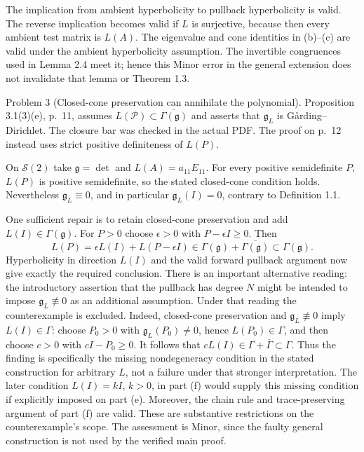 \documentclass[10pt]{article}
\begin{document}
The implication from ambient hyperbolicity to pullback hyperbolicity is valid. The reverse implication becomes valid if \(L\) is surjective, because then every ambient test matrix is \(L(A)\). The eigenvalue and cone identities in (b)–(c) are valid under the ambient hyperbolicity assumption. The invertible congruences used in Lemma 2.4 meet it; hence this Minor error in the general extension does not invalidate that lemma or Theorem 1.3.\par
Problem 3 (Closed-cone preservation can annihilate the polynomial).  Proposition 3.1(3)(e), p. 11, assumes \(L(\mathcal P)\subset\overline{\Gamma(\mathfrak g)}\) and asserts that \(\mathfrak g_L\) is Gårding–Dirichlet. The closure bar was checked in the actual PDF. The proof on p. 12 instead uses strict positive definiteness of \(L(P)\).\par
On \(\mathcal S(2)\) take \(\mathfrak g=\det\) and \(L(A)=a_{11}E_{11}\). For every positive semidefinite \(P\), \(L(P)\) is positive semidefinite, so the stated closed-cone condition holds. Nevertheless \(\mathfrak g_L\equiv0\), and in particular \(\mathfrak g_L(I)=0\), contrary to Definition 1.1.\par
One sufficient repair is to retain closed-cone preservation and add \(L(I)\in\Gamma(\mathfrak g)\). For \(P>0\) choose \(\epsilon>0\) with \(P-\epsilon I\geq0\). Then \[L(P)=\epsilon L(I)+L(P-\epsilon I)
       \in\Gamma(\mathfrak g)+\overline{\Gamma(\mathfrak g)}
       \subset\Gamma(\mathfrak g).\] Hyperbolicity in direction \(L(I)\) and the valid forward pullback argument now give exactly the required conclusion. There is an important alternative reading: the introductory assertion that the pullback has degree \(N\) might be intended to impose \(\mathfrak g_L\not\equiv0\) as an additional assumption. Under that reading the counterexample is excluded. Indeed, closed-cone preservation and \(\mathfrak g_L\not\equiv0\) imply \(L(I)\in\Gamma\): choose \(P_0>0\) with \(\mathfrak g_L(P_0)\neq0\), hence \(L(P_0)\in\Gamma\), and then choose \(c>0\) with \(cI-P_0\geq0\). It follows that \(cL(I)\in\Gamma+\overline\Gamma\subset\Gamma\). Thus the finding is specifically the missing nondegeneracy condition in the stated construction for arbitrary \(L\), not a failure under that stronger interpretation. The later condition \(L(I)=kI\), \(k>0\), in part (f) would supply this missing condition if explicitly imposed on part (e). Moreover, the chain rule and trace-preserving argument of part (f) are valid. These are substantive restrictions on the counterexample’s scope. The assessment is Minor, since the faulty general construction is not used by the verified main proof.\par
\end{document}
